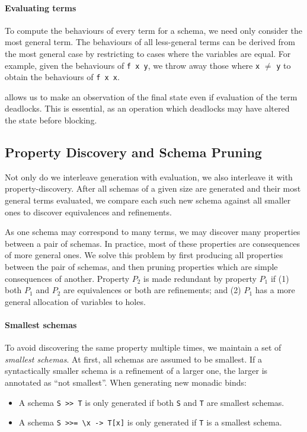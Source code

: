 \paragraph{Evaluating terms}
To compute the behaviours of every term for a schema, we need only
consider the most general term.  The behaviours of all less-general
terms can be derived from the most general case by restricting to
cases where the variables are equal.  For example, given the
behaviours of \verb|f x y|, we throw away those where \verb|x| $\neq$
\verb|y| to obtain the behaviours of \verb|f x x|.

\dejafu{} allows us to make an observation of the final state even if
evaluation of the term deadlocks.  This is essential, as an operation
which deadlocks may have altered the state before blocking.

\subsection{Property Discovery and Schema Pruning}
\label{sec:coco-hiw-prune}

Not only do we interleave generation with evaluation, we also
interleave it with property-discovery.  After all schemas of a given
size are generated and their most general terms evaluated, we compare
each such new schema against all smaller ones to discover equivalences
and refinements.

As one schema may correspond to many terms, we may discover many
properties between a pair of schemas.  In practice, most of these
properties are consequences of more general ones.  We solve this
problem by first producing all properties between the pair of schemas,
and then pruning properties which are simple consequences of another.
Property $P_2$ is made redundant by property $P_1$ if (1) both $P_1$
and $P_2$ are equivalences or both are refinements; and (2) $P_1$ has
a more general allocation of variables to holes.

\paragraph{Smallest schemas}
To avoid discovering the same property multiple times, we maintain a
set of \emph{smallest schemas}.  At first, all schemas are assumed to
be smallest.  If a syntactically smaller schema is a refinement of a
larger one, the larger is annotated as ``not smallest''.  When
generating new monadic binds:

\begin{itemize}
\item A schema \verb|S >> T| is only generated if both \verb|S| and
  \verb|T| are smallest schemas.
\item A schema \verb|S >>= \x -> T[x]| is only generated if \verb|T|
  is a smallest schema.
\end{itemize}

